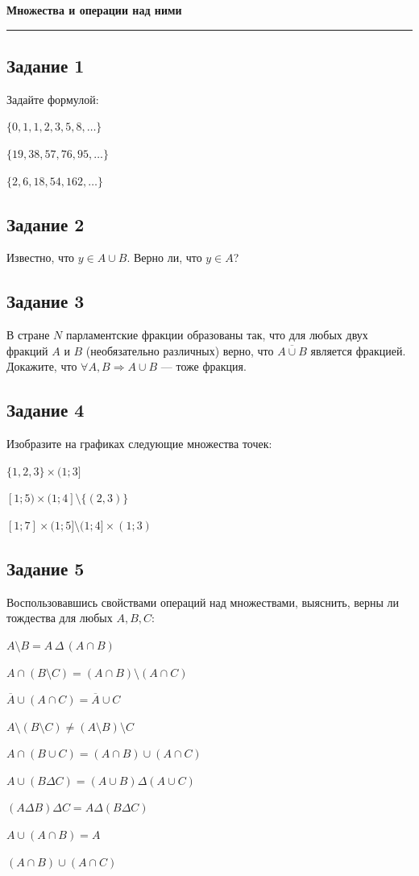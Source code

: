 \documentclass[a4paper,12pt,oneside]{article}
\newcommand{\Task}[1]{%
  \subsection*{#1}%
  \vspace{-0.2\baselineskip}%
}
\begin{document}
\begin{center}
    {\Large\bfseries Множества и операции над ними}\\[1mm]
\end{center}
\vspace{2mm}
\hrule
\vspace{4mm}

\Task{Задание 1}
Задайте формулой:
\begin{numlist}
    \item $\{0, 1, 1, 2, 3, 5, 8, \dots\}$
    \item $\{19, 38, 57, 76, 95, \dots\}$
    \item $\{2, 6, 18, 54, 162, \dots\}$
\end{numlist}

\Task{Задание 2}
Известно, что $y \in A \cup B$. Верно ли, что $y \in A$?

\Task{Задание 3}
В стране $N$ парламентские фракции образованы так, что для любых двух фракций $A$ и $B$ (необязательно различных) верно, что $\overline{A \cup B}$ является фракцией. Докажите, что $\forall A,B \Rightarrow A \cup B$ — тоже фракция.

\Task{Задание 4}
Изобразите на графиках следующие множества точек:
\begin{numlist}
    \item $\{1,2,3\} \times (1; 3]$
    \item $[1; 5) \times (1; 4] \setminus \{(2, 3)\}$
    \item $[1; 7] \times (1;5] \setminus (1;4] \times (1;3)$
\end{numlist}

\Task{Задание 5}
Воспользовавшись свойствами операций над множествами, выяснить, верны ли тождества для любых $A, B, C$:
\begin{numlist}
    \item $A \setminus B = A \,\Delta\, (A \cap B)$
    \item $A \cap (B \setminus C) = (A \cap B)\setminus (A \cap C)$
    \item $\overline{A} \cup (A \cap C) = \overline{A} \cup C$
    \item $A \setminus (B \setminus C) \neq (A \setminus B) \setminus C$
    \item $A \cap (B \cup C) = (A \cap B) \cup (A \cap C)$
    \item $A \cup (B \Delta C) = (A \cup B) \Delta (A \cup C)$
    \item $(A \Delta B) \Delta C = A \Delta (B \Delta C)$
    \item $A \cup (A \cap B) = A$
    \item $(A \cap B) \cup (A \cap C)$
\end{numlist}
\end{document}
